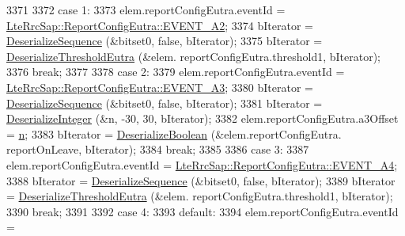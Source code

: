 \begin{DoxyCode}
3371 
3372                     \textcolor{keywordflow}{case} 1:
3373                       elem.reportConfigEutra.eventId = 
      \hyperlink{structns3_1_1LteRrcSap_1_1ReportConfigEutra_ab8152dc095987f60bee2e9115046902fa11aae7a908ccf8a73b5aeed0cd8be53e}{LteRrcSap::ReportConfigEutra::EVENT\_A2};
3374                       bIterator = \hyperlink{classns3_1_1Asn1Header_a58c68bb97ba3fe2e8fcdd7c208d672b2}{DeserializeSequence} (&bitset0, \textcolor{keyword}{false}, bIterator);
3375                       bIterator = \hyperlink{classns3_1_1RrcAsn1Header_a80f5e686675bee0701149a16b9f2d37b}{DeserializeThresholdEutra} (&elem.
      reportConfigEutra.threshold1, bIterator);
3376                       \textcolor{keywordflow}{break};
3377 
3378                     \textcolor{keywordflow}{case} 2:
3379                       elem.reportConfigEutra.eventId = 
      \hyperlink{structns3_1_1LteRrcSap_1_1ReportConfigEutra_ab8152dc095987f60bee2e9115046902fa2899a3564e1c06edb586b1768ccf3acd}{LteRrcSap::ReportConfigEutra::EVENT\_A3};
3380                       bIterator = \hyperlink{classns3_1_1Asn1Header_a58c68bb97ba3fe2e8fcdd7c208d672b2}{DeserializeSequence} (&bitset0, \textcolor{keyword}{false}, bIterator);
3381                       bIterator = \hyperlink{classns3_1_1Asn1Header_a49802c9af30018b078150e866b6ecae2}{DeserializeInteger} (&n, -30, 30, bIterator);
3382                       elem.reportConfigEutra.a3Offset = \hyperlink{namespacesample-rng-plot_aeb5ee5c431e338ef39b7ac5431242e1d}{n};
3383                       bIterator = \hyperlink{classns3_1_1Asn1Header_ab46f4b86988a0fbeb5df11a9bc46222d}{DeserializeBoolean} (&elem.reportConfigEutra.
      reportOnLeave, bIterator);
3384                       \textcolor{keywordflow}{break};
3385 
3386                     \textcolor{keywordflow}{case} 3:
3387                       elem.reportConfigEutra.eventId = 
      \hyperlink{structns3_1_1LteRrcSap_1_1ReportConfigEutra_ab8152dc095987f60bee2e9115046902fa6b8e5f5e5eea05c9441816bd32aaf6c0}{LteRrcSap::ReportConfigEutra::EVENT\_A4};
3388                       bIterator = \hyperlink{classns3_1_1Asn1Header_a58c68bb97ba3fe2e8fcdd7c208d672b2}{DeserializeSequence} (&bitset0, \textcolor{keyword}{false}, bIterator);
3389                       bIterator = \hyperlink{classns3_1_1RrcAsn1Header_a80f5e686675bee0701149a16b9f2d37b}{DeserializeThresholdEutra} (&elem.
      reportConfigEutra.threshold1, bIterator);
3390                       \textcolor{keywordflow}{break};
3391 
3392                     \textcolor{keywordflow}{case} 4:
3393                     \textcolor{keywordflow}{default}:
3394                       elem.reportConfigEutra.eventId = 

\end{DoxyCode}
